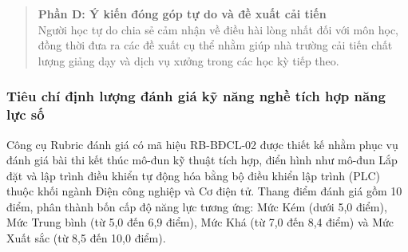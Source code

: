 \begin{quote}
\textbf{Phần D: Ý kiến đóng góp tự do và đề xuất cải tiến}\\[0.15cm]
Người học tự do chia sẻ cảm nhận về điều hài lòng nhất đối với môn học, đồng thời đưa ra các đề xuất cụ thể nhằm giúp nhà trường cải tiến chất lượng giảng dạy và dịch vụ xưởng trong các học kỳ tiếp theo.
\end{quote}

\subsubsection{Tiêu chí định lượng đánh giá kỹ năng nghề tích hợp năng lực số}

Công cụ Rubric đánh giá có mã hiệu RB-BĐCL-02 được thiết kế nhằm phục vụ đánh giá bài thi kết thúc mô-đun kỹ thuật tích hợp, điển hình như mô-đun Lắp đặt và lập trình điều khiển tự động hóa bằng bộ điều khiển lập trình (PLC) thuộc khối ngành Điện công nghiệp và Cơ điện tử. Thang điểm đánh giá gồm 10 điểm, phân thành bốn cấp độ năng lực tương ứng: Mức Kém (dưới 5,0 điểm), Mức Trung bình (từ 5,0 đến 6,9 điểm), Mức Khá (từ 7,0 đến 8,4 điểm) và Mức Xuất sắc (từ 8,5 đến 10,0 điểm).

